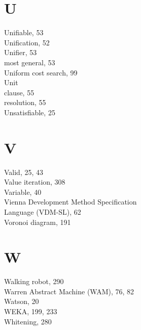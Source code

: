 \documentclass[10pt]{article}
\begin{document}
\section*{U}
Unifiable, 53\\
Unification, 52\\
Unifier, 53\\
most general, 53\\
Uniform cost search, 99\\
Unit\\
clause, 55\\
resolution, 55\\
Unsatisfiable, 25

\section*{V}
Valid, 25, 43\\
Value iteration, 308\\
Variable, 40\\
Vienna Development Method Specification\\
Language (VDM-SL), 62\\
Voronoi diagram, 191

\section*{W}
Walking robot, 290\\
Warren Abstract Machine (WAM), 76, 82\\
Watson, 20\\
WEKA, 199, 233\\
Whitening, 280
\end{document}
